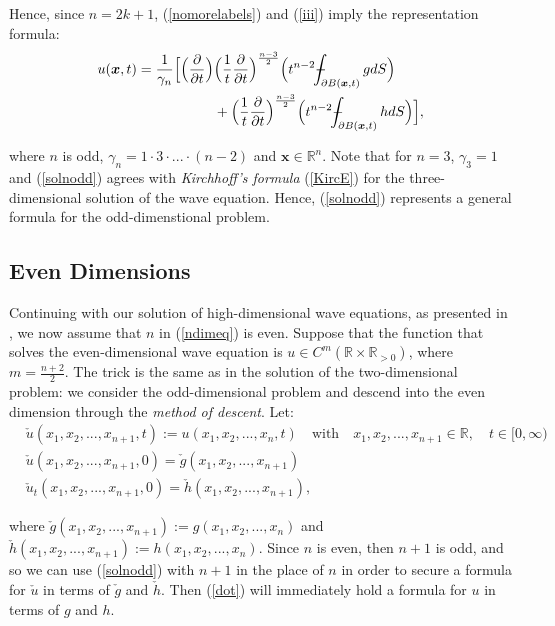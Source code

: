 \documentclass[a4paper, 12pt]{article}
\def\Xint#1{\mathchoice
{\XXint\displaystyle\textstyle{#1}}%
{\XXint\textstyle\scriptstyle{#1}}%
{\XXint\scriptstyle\scriptscriptstyle{#1}}%
{\XXint\scriptscriptstyle\scriptscriptstyle{#1}}%
\!\int}
\def\XXint#1#2#3{{\setbox0=\hbox{$#1{#2#3}{\int}$ }
\vcenter{\hbox{$#2#3$ }}\kern-.6\wd0}}
\def\dashint{\Xint-}
\numberwithin{equation}{section}
\begin{document}
Hence, since $n=2k+1$, (\ref{nomorelabels}) and (\ref{iii}) imply the
representation formula:
\begin{equation} \label{solnodd}
    \begin{split}
        u(\boldsymbol{x}, t)=\frac{1}{\gamma_n}\Big[\Big(\diffp[1]{}{t}\Big) & \Big(\frac{1}{t} \diffp[1]{}{t} \Big)^{\frac{n-3}{2}}\Big(t^{n-2} \dashint_{\partial B(\boldsymbol{x},t)}gdS \Big)\\
        &+ \Big(\frac{1}{t} \diffp[1]{}{t} \Big)^{\frac{n-3}{2}}\Big(t^{n-2} \dashint_{\partial B(\boldsymbol{x},t)}hdS \Big)\Big],
    \end{split}
\end{equation} 

where $n$ is odd, $\gamma_n=1 \cdot 3 \cdot ... \cdot (n-2)$ and
$\boldsymbol{x}\in \mathbb{R}^n$. Note that for $n=3$, $\gamma_3 = 1$ and
(\ref{solnodd}) agrees with \emph{Kirchhoff's formula} (\ref{KircE}) for the
three-dimensional solution of the wave equation. Hence, (\ref{solnodd})
represents a general formula for the odd-dimenstional problem.

\subsection{Even Dimensions}
Continuing with our solution of high-dimensional wave equations, as presented in
\cite[Ch. 2.4.1.e]{Ev}, we now assume that $n$ in (\ref{ndimeq}) is even.
Suppose that the function that solves the even-dimensional wave equation is $u
\in C^m(\mathbb{R} \times \mathbb{R}_{>0})$, where $m=\frac{n+2}{2}$. The trick is the same as in the solution of
the two-dimensional problem: we consider the odd-dimensional problem and descend
into the even dimension through the \emph{method of descent}. Let:
\begin{equation} \label{dot}
    \begin{aligned}
        &\check{u}(x_1, x_2, ..., x_{n+1}, t):=u(x_1, x_2, ..., x_n, t) \quad \textrm{with} \quad x_1, x_2, ..., x_{n+1} \in \mathbb{R}, \quad t \in [0, \infty)\\
        &\check{u}(x_1, x_2, ..., x_{n+1}, 0)=\check{g}(x_1, x_2, ..., x_{n+1})\\
        &\check{u}_t(x_1, x_2, ..., x_{n+1}, 0)=\check{h}(x_1, x_2, ..., x_{n+1}),
    \end{aligned}
\end{equation}

where $\check{g}(x_1, x_2, ..., x_{n+1}):=g(x_1, x_2, ..., x_n)$ and
$\check{h}(x_1, x_2, ..., x_{n+1}):=h(x_1, x_2, ..., x_n)$. Since $n$ is even,
then $n+1$ is odd, and so we can use (\ref{solnodd}) with $n+1$ in the place of
$n$ in order to secure a formula for $\check{u}$ in terms of $\check{g}$ and
$\check{h}$. Then (\ref{dot}) will immediately hold a formula for $u$ in terms of
$g$ and $h$.\\
\end{document}
